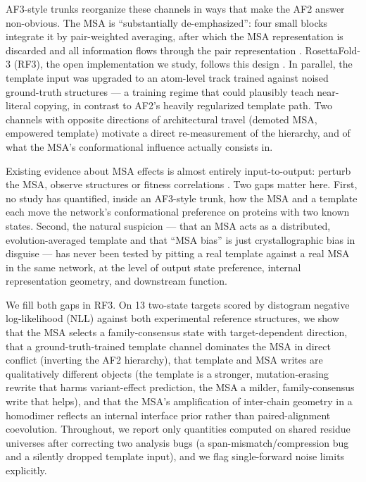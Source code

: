 \documentclass[11pt]{article}
\begin{document}
AF3-style trunks reorganize these channels in ways that make the AF2 answer
non-obvious. The MSA is ``substantially de-emphasized'': four small blocks
integrate it by pair-weighted averaging, after which the MSA representation
is discarded and all information flows through the pair representation
\cite{abramson2024}. RosettaFold-3 (RF3), the open implementation we study,
follows this design \cite{corley2025}. In parallel, the template input was
upgraded to an atom-level track trained against noised ground-truth
structures \cite{corley2025} --- a training regime that could plausibly teach
near-literal copying, in contrast to AF2's heavily regularized template
path. Two channels with opposite directions of architectural travel
(demoted MSA, empowered template) motivate a direct re-measurement of the
hierarchy, and of what the MSA's conformational influence actually consists
in.

Existing evidence about MSA effects is almost entirely input-to-output:
perturb the MSA, observe structures or fitness correlations
\cite{delalamo2022,stein2022,wayment2024,saldano2022}. Two gaps matter here.
First, no study has quantified, inside an AF3-style trunk, how the MSA and a
template each move the network's conformational preference on proteins with
two known states. Second, the natural suspicion --- that an MSA acts as a
distributed, evolution-averaged template and that ``MSA bias'' is just
crystallographic bias in disguise \cite{heo2022,sala2023,kovalevskiy2024}
--- has never been tested by pitting a real template against a real MSA in
the same network, at the level of output state preference, internal
representation geometry, and downstream function.

We fill both gaps in RF3. On 13 two-state targets scored by distogram
negative log-likelihood (NLL) against both experimental reference
structures, we show that the MSA selects a family-consensus state with
target-dependent direction, that a ground-truth-trained template channel
dominates the MSA in direct conflict (inverting the AF2 hierarchy), that
template and MSA writes are qualitatively different objects (the template is
a stronger, mutation-erasing rewrite that harms variant-effect prediction,
the MSA a milder, family-consensus write that helps), and that the MSA's
amplification of inter-chain geometry in a homodimer reflects an internal
interface prior rather than paired-alignment coevolution. Throughout, we
report only quantities computed on shared residue universes after correcting
two analysis bugs (a span-mismatch/compression bug and a silently dropped
template input), and we flag single-forward noise limits explicitly.
\end{document}

